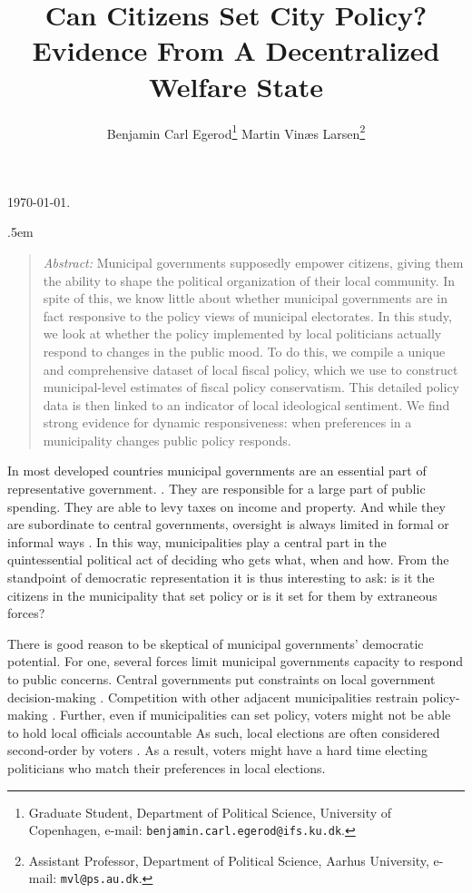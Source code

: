 \documentclass[a4paper,12pt]{article}
\title{\bigskip \bigskip \sffamily \LARGE{Can Citizens Set City Policy?} \\ \Large{ Evidence From A Decentralized Welfare State}}
\author{\bigskip Benjamin Carl Egerod\footnote[2]{Graduate Student, Department of Political Science, University of Copenhagen, e-mail: \texttt{benjamin.carl.egerod@ifs.ku.dk}.} \qquad Martin Vinæs Larsen\footnote[3]{Assistant Professor, Department of Political Science, Aarhus University, e-mail: \texttt{mvl@ps.au.dk}.}}
\makeatletter
\renewcommand{\maketitle}{
	\begin{flushleft}
		
		\onehalfspacing
		
		\@title
		
		\lineskip .5em
		\normalfont{\normalsize{\@author}}
\end{flushleft}}
\makeatother
\begin{document}
	
	\begin{footnotesize} \noindent \today. \end{footnotesize} %
	
	\vspace{0.7in}
	
	\maketitle
	
	\bigskip
	
	\begin{quotation} %

		\small \noindent \emph{Abstract:} Municipal governments supposedly empower citizens, giving them the ability to shape the political organization of their local community. In spite of this, we know little about whether municipal governments are in fact responsive to the policy views of municipal electorates. In this study, we look at whether the policy implemented by local politicians actually respond to changes in the public mood. To do this, we compile a unique and comprehensive dataset of local fiscal policy, which we use to construct municipal-level estimates of fiscal policy conservatism. This detailed policy data is then linked to an indicator of local ideological sentiment. We find strong evidence for dynamic responsiveness: when preferences in a municipality changes public policy responds.
	\end{quotation}



	
	\thispagestyle{empty} %
	
	
\clearpage


\noindent In most developed countries municipal governments are an essential part of representative government. \citep{trounstine2009all,kersting2013reforming}. They are responsible for a large part of public spending.  They are able to levy taxes on income and property. And while they are subordinate to central governments, oversight is always limited in formal or informal ways \citep{oecd2016subnational}. In this way, municipalities play a central part in the quintessential political act of deciding who gets what, when and how. From the standpoint of democratic representation it is thus interesting to ask: is it the citizens in the municipality that set policy or is it set for them by extraneous forces?

There is good reason to be skeptical of municipal governments' democratic potential. For one,  several forces limit municipal governments capacity to respond to public concerns. Central governments put constraints on local government decision-making \citep{peterson1981city}. Competition with other adjacent municipalities restrain policy-making \citep{salmon2006horizontal,tiebout1956pure}. Further, even if municipalities can set policy, voters might not be able to hold local officials accountable\citep[e.g.,][]{sances2017attribution} As such, local elections are often considered second-order by voters \citep[e.g.,][]{marsh1998testing}. As a result, voters might have a hard time electing politicians who match their preferences in local elections. 
\end{document}
